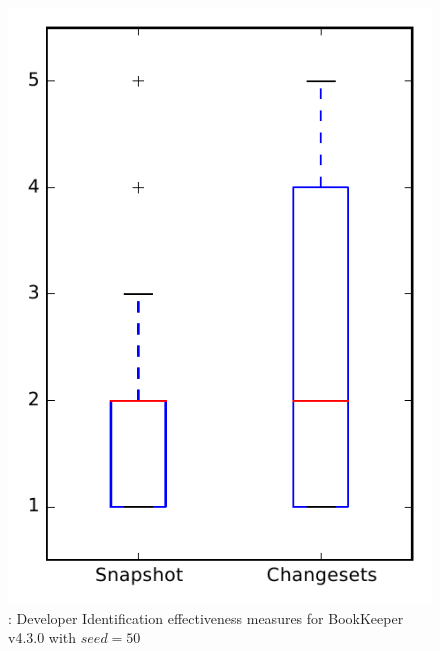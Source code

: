 
\begin{figure}
\centering
\includegraphics[height=0.4\textheight]{figures/dit_seed/rq1_bookkeeper_50}
\caption{\rtwo: Developer Identification effectiveness measures for BookKeeper v4.3.0 with $seed=50$}
\label{fig:dit_seed:rq1:bookkeeper}
\end{figure}
